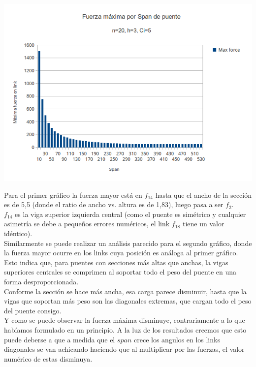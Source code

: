 \begin{center}
\includegraphics[scale=0.8]{archivos/graficos/Fuerza-x-span2.png}\\
\end{center}

Para el primer gráfico la fuerza mayor está en $f_{14}$ hasta que el ancho de la sección es de 5,5 (donde el ratio de ancho vs. altura es de 1,83), luego pasa a ser $f_2$.\\

$f_{14}$ es la viga superior izquierda central (como el puente es simétrico y cualquier asimetría se debe a pequeños errores numéricos, el link $f_{18}$ tiene un valor idéntico).\\

Similarmente se puede realizar un análisis parecido para el segundo gráfico, donde la fuerza mayor ocurre en los links cuya posición es análoga al primer gráfico.\\

Esto indica que, para puentes con secciones más altas que anchas, la vigas superiores centrales se comprimen al soportar todo el peso del puente en una forma desproporcionada.\\

Conforme la sección se hace más ancha, esa carga parece disminuir, hasta que la vigas que soportan más peso son las diagonales extremas, que cargan todo el peso del puente consigo.\\

Y como se puede observar la fuerza máxima disminuye, contrariamente a lo que habíamos formulado en un principio. A la luz de los resultados creemos que esto puede deberse a que a medida que el $span$ crece los angulos en los links diagonales se van achicando haciendo que al multiplicar por las fuerzas, el valor numérico de estas disminuya.\\

